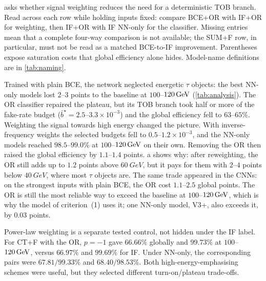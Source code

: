  asks whether signal weighting reduces the need for a deterministic TOB branch. Read across each row while holding inputs fixed: compare BCE+OR with IF+OR for weighting, then IF+OR with IF NN-only for the classifier. Missing entries mean that a complete four-way comparison is not available; the SUM+F row, in particular, must not be read as a matched BCE-to-IF improvement. Parentheses expose saturation costs that global efficiency alone hides. Model-name definitions are in \cref{tab:naming}.

\begin{table}[ht]
  \centering
  \caption{Weighting and OR comparisons on fixed MLP inputs. Entries are global efficiency [\%], with $100$--$120\GeV$ efficiency in parentheses. OR entries additionally give mean TOB budget $\bar b^\star$ in units of $10^{-3}$. IF is inverse frequency, not $t^{-p}$ (\cref{tab:naming,app:weighting}).}
  \label{tab:analysis}
  \small
  
\end{table}

Trained with plain BCE, the network neglected energetic $\tau$ objects: the best NN-only models lost $2$--$3$ points to the baseline at $100$--$120\GeV$ (\cref{tab:analysis}). The OR classifier repaired the plateau, but its TOB branch took half or more of the fake-rate budget ($\bar b^\star=2.5$--$3.3\times10^{-3}$) and the global efficiency fell to $63$--$65\%$. Weighting the signal towards high energy changed the picture. With inverse-frequency weights the selected budgets fell to $0.5$--$1.2\times10^{-3}$, and the NN-only models reached $98.5$--$99.0\%$ at $100$--$120\GeV$ on their own. Removing the OR then raised the global efficiency by $1.1$--$1.4$ points. a shows why: after reweighting, the OR still adds up to $1.2$ points above $\SI{60}{GeV}$, but it pays for them with $2$--$4$ points below $\SI{40}{GeV}$, where most $\tau$ objects are. The same trade appeared in the CNNs: on the strongest inputs with plain BCE, the OR cost $1.1$--$2.5$ global points. The OR is still the most reliable way to exceed the baseline at $100$--$120\GeV$, which is why the model of criterion~(1) uses it; one NN-only model, V3+\Ffeat, also exceeds it, by $0.03$ points.

Power-law weighting is a separate tested control, not hidden under the IF label. For CT+F with the OR, $p=-1$ gave $66.66\%$ globally and $99.73\%$ at $100$--$120\GeV$, versus $66.97\%$ and $99.69\%$ for IF. Under NN-only, the corresponding pairs were $67.81/99.33\%$ and $68.40/98.53\%$. Both high-energy-emphasising schemes were useful, but they selected different turn-on/plateau trade-offs.

